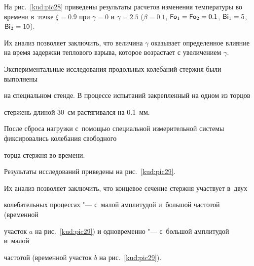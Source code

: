 На рис.~\ref{kud:pic28} приведены результаты расчетов изменения температуры во времени в~точке $\xi =0.9$ при $\gamma =0$ и $\gamma = 2.5$ ($\beta = 0.1$, $\operatorname{\sf Fo}_ 1 =\operatorname{\sf Fo}_2 =0.1$, $ {\sf Bi}_1 =5$, $ {\sf Bi}_2 =10$). 

Их анализ позволяет заключить, что величина $\gamma $ оказывает определенное влияние на время задержки теплового взрыва, которое возрастает с увеличением $\gamma $.








%

%

%




\smallskip




Экспериментальные исследования продольных колебаний стержня были выполнены

на специальном стенде. В процессе испытаний закрепленный на одном из торцов

стержень длиной 30~см растягивался на 0.1~мм. 

После сброса нагрузки с~помощью специальной измерительной системы фиксировались колебания свободного

торца стержня во времени. 

Результаты исследований приведены на рис.~\ref{kud:pic29}. 

Их анализ позволяет заключить, что концевое сечение стержня участвует в~двух

колебательных процессах "--- с~малой амплитудой и~большой частотой (временной

участок $a$ на рис.~\ref{kud:pic29}) и одновременно "--- с~большой амплитудой и~малой

частотой (временной участок $b$ на рис.~\ref{kud:pic29}).



